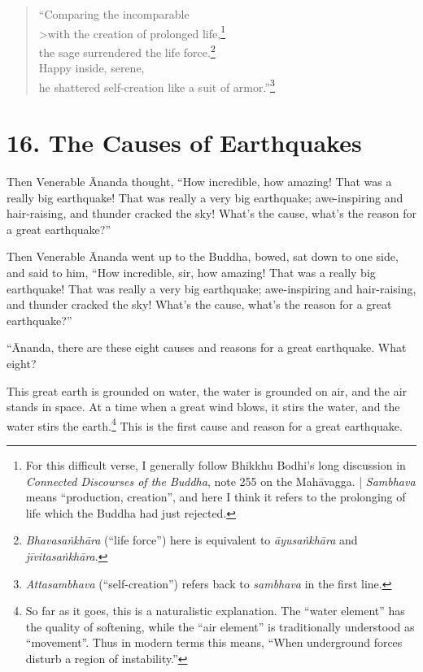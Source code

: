 \documentclass[12pt,openany]{book}%
\begin{document}
\begin{verse}%
“Comparing the incomparable \\>with the creation of prolonged life,\footnote{For this difficult verse, I generally follow Bhikkhu Bodhi’s long discussion in \emph{Connected Discourses of the Buddha}, note 255 on the \textsanskrit{Mahāvagga}. | \textit{Sambhava} means “production, creation”, and here I think it refers to the prolonging of life which the Buddha had just rejected. } \\
the sage surrendered the life force.\footnote{\textit{\textsanskrit{Bhavasaṅkhāra}} (“life force”) here is equivalent to \textit{\textsanskrit{āyusaṅkhāra}} and \textit{\textsanskrit{jīvitasaṅkhāra}}. } \\
Happy inside, serene, \\
he shattered self-creation like a suit of armor.”\footnote{\textit{Attasambhava} (“self-creation”) refers back to \textit{sambhava} in the first line. } 

%
\end{verse}

\section*{16. The Causes of Earthquakes }

Then Venerable Ānanda thought, “How incredible, how amazing! That was a really big earthquake! That was really a very big earthquake; awe-inspiring and hair-raising, and thunder cracked the sky! What’s the cause, what’s the reason for a great earthquake?” 

Then Venerable Ānanda went up to the Buddha, bowed, sat down to one side, and said to him, “How incredible, sir, how amazing! That was a really big earthquake! That was really a very big earthquake; awe-inspiring and hair-raising, and thunder cracked the sky! What’s the cause, what’s the reason for a great earthquake?” 

“Ānanda, there are these eight causes and reasons for a great earthquake. What eight? 

This great earth is grounded on water, the water is grounded on air, and the air stands in space. At a time when a great wind blows, it stirs the water, and the water stirs the earth.\footnote{So far as it goes, this is a naturalistic explanation. The “water element” has the quality of softening, while the “air element” is traditionally understood as “movement”. Thus in modern terms this means, “When underground forces disturb a region of instability.” } This is the first cause and reason for a great earthquake. 
\end{document}
